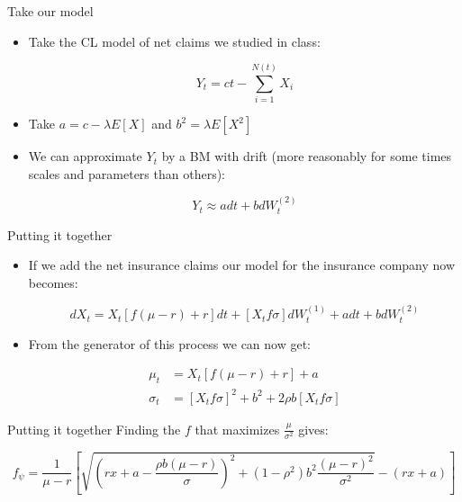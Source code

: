 \documentclass[11pt]{beamer}
\begin{document}
\begin{frame}{Take our model}

\begin{itemize}

\item Take the CL model of net claims we studied in class:

$$ Y_t = ct - \sum_{i=1}^{N(t)}X_i $$
\vfill

\item Take $a=c - \lambda E[X]$ and $b^2=\lambda E[X^2]$
\vfill

\item We can approximate $Y_t$ by a BM with drift (more reasonably for some times scales and parameters than others):

$$ Y_t \approx adt + b dW^{(2)}_t $$ 

\end{itemize}

\end{frame}
\begin{frame}{Putting it together}

\begin{itemize}

\item If we add the net insurance claims our model for the insurance company now becomes:

$$ dX_t =  X_t [f(\mu-r) + r ]dt + [ X_t f\sigma ]dW^{(1)}_t +  adt + b dW^{(2)}_t $$

\item From the generator of this process we can now get:

\begin{align*}
\mu_t &= X_t [f(\mu-r) + r ] + a \\
\sigma_t &= [ X_t f\sigma ]^2 + b^2 + 2\rho b [ X_t f\sigma ]
\end{align*}

\end{itemize}

\end{frame}
\begin{frame}{Putting it together}
Finding the $f$ that maximizes $\frac{\mu}{\sigma^2}$ gives:

\vfill
{\small
$$ f_\psi = \frac{1}{\mu-r}\left[ \sqrt{ \left( rx+a - \frac{\rho b (\mu -r)}{\sigma} \right)^2 + (1-\rho^2)b^2\frac{(\mu-r)^2}{\sigma^2} } - (rx + a) \right] $$
}

\vfill
\end{frame}
\end{document}

